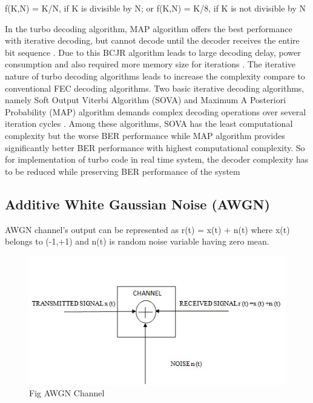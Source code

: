 \documentclass[conference,a4paper]{IEEEtran}
\begin{document}
f(K,N) = K/N, if K is divisible by N; or f(K,N) = K/8, if K is not divisible by N

In the turbo decoding algorithm, MAP algorithm offers the best performance with iterative decoding, but cannot decode until the decoder receives the entire bit sequence . Due to this BCJR algorithm leads to large decoding delay, power consumption and also required more memory size for iterations . The iterative nature of turbo decoding algorithms leads to increase the complexity compare to conventional FEC decoding algorithms. Two basic iterative decoding algorithms, namely Soft Output Viterbi Algorithm (SOVA) and Maximum A Posteriori Probability (MAP) algorithm demands complex decoding operations over several iteration cycles . Among these algorithms, SOVA has the least computational complexity but the worse BER performance while MAP algorithm provides significantly better BER performance with highest computational complexity. So for implementation of turbo code in real time system, the decoder complexity has to be reduced while preserving BER performance of the system
 




\subsection{Additive White Gaussian Noise (AWGN)
}
AWGN channel’s output can be represented as r(t) = x(t) + n(t) where x(t) belongs to (-1,+1) and n(t) is random noise variable having zero mean.

\begin{figure}[h!]
    \centering
    \includegraphics[scale=0.48]{fig15.jpg}
    \caption{Fig AWGN Channel}
    \label{fig:my_label}
\end{figure}
\end{document}
